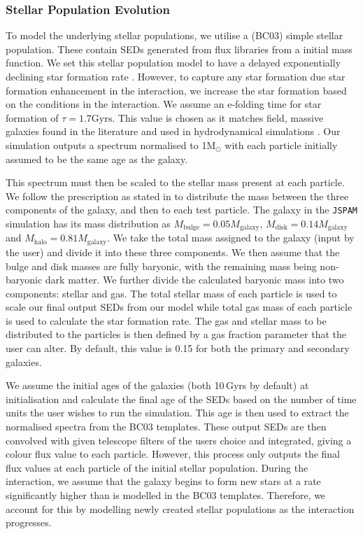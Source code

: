 \subsubsection{Stellar Population Evolution}\label{Stellar_Pop_Evol}
To model the underlying stellar populations, we utilise a \citet{2003MNRAS.344.1000B} (BC03) simple stellar population. These contain SEDs generated from flux libraries from a \citet{2003PASP..115..763C} initial mass function. We set this stellar population model to have a delayed exponentially declining star formation rate \citep{2009ApJ...690..802J, 2013ApJ...762L..15P,2014arXiv1404.0402S, 2019A&A...622A.103B}. However, to capture any star formation due star formation enhancement in the interaction, we increase the star formation based on the conditions in the interaction. We assume an e-folding time for star formation of $\tau = 1.7\text{Gyrs}$. This value is chosen as it matches field, massive galaxies found in the literature \citep[e.g][]{2010ApJ...721..193P} and used in hydrodynamical simulations \citep[e.g.][]{2022ApJ...941....5J}. Our simulation outputs a spectrum normalised to 1M$_{\odot}$ with each particle initially assumed to be the same age as the galaxy.

This spectrum must then be scaled to the stellar mass present at each particle. We follow the prescription as stated in \citet{2016A&C....16...26W} to distribute the mass between the three components of the galaxy, and then to each test particle. The galaxy in the \texttt{JSPAM} simulation has its mass distribution as $M_{\text{bulge}} = 0.05M_{\text{galaxy}}$, $M_{\text{disk}} = 0.14M_{\text{galaxy}}$ and $M_{\text{halo}} = 0.81M_{\text{galaxy}}$. We take the total mass assigned to the galaxy (input by the user) and divide it into these three components. We then assume that the bulge and disk masses are fully baryonic, with the remaining mass being non-baryonic dark matter. We further divide the calculated baryonic mass into two components: stellar and gas. The total stellar mass of each particle is used to scale our final output SEDs from our model while total gas mass of each particle is used to calculate the star formation rate. The gas and stellar mass to be distributed to the particles is then defined by a gas fraction parameter that the user can alter. By default, this value is 0.15 for both the primary and secondary galaxies.

We assume the initial ages of the galaxies (both 10\,Gyrs by default) at initialisation and calculate the final age of the SEDs based on the number of time units the user wishes to run the simulation. This age is then used to extract the normalised spectra from the BC03 templates. These output SEDs are then convolved with given telescope filters of the users choice and integrated, giving a colour flux value to each particle. However, this process only outputs the final flux values at each particle of the initial stellar population. During the interaction, we assume that the galaxy begins to form new stars at a rate significantly higher than is modelled in the BC03 templates. Therefore, we account for this by modelling newly created stellar populations as the interaction progresses.

